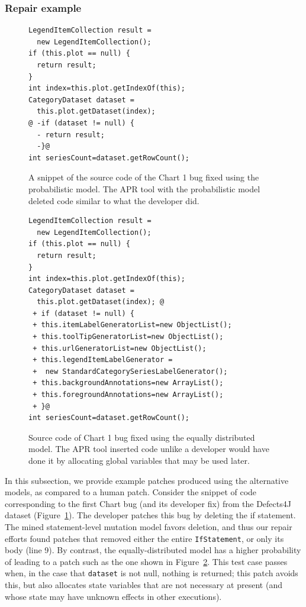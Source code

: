\documentclass[conference]{IEEEtran}
\begin{document}
\subsubsection{Repair example} \label{examPatches}

\begin{figure}[t]
\begin{lstlisting}[frame=single,style=base]
LegendItemCollection result = 
  new LegendItemCollection();
if (this.plot == null) {
  return result;
}
int index=this.plot.getIndexOf(this);
CategoryDataset dataset = 
  this.plot.getDataset(index);
@ -if (dataset != null) {
  - return result;
  -}@
int seriesCount=dataset.getRowCount();
	\end{lstlisting}
	\caption{A snippet of the source code of the Chart 1 bug fixed using the
      probabilistic model. The APR tool with the probabilistic model deleted code similar to what the
      developer did.\label{fig:chart1.1}}
\end{figure}

\begin{figure}[t]
\begin{lstlisting}[frame=single,style=base]
LegendItemCollection result = 
  new LegendItemCollection();
if (this.plot == null) {
  return result;
}
int index=this.plot.getIndexOf(this);
CategoryDataset dataset = 
  this.plot.getDataset(index); @
 + if (dataset != null) { 
 + this.itemLabelGeneratorList=new ObjectList();
 + this.toolTipGeneratorList=new ObjectList();
 + this.urlGeneratorList=new ObjectList();
 + this.legendItemLabelGenerator = 
 +  new StandardCategorySeriesLabelGenerator();
 + this.backgroundAnnotations=new ArrayList();
 + this.foregroundAnnotations=new ArrayList();
 + }@
int seriesCount=dataset.getRowCount();
	\end{lstlisting}
	\caption{Source code of Chart 1 bug fixed using the equally distributed
      model. The APR tool inserted code unlike a developer would have done it by
      allocating global variables that may be used later.\label{fig:chart1.3}}

\end{figure}


In this subsection, we provide example patches produced using the alternative
models, as compared to a human patch.  Consider the snippet of code corresponding
to the first Chart bug (and its developer fix) from the Defects4J dataset
(Figure~\ref{fig:chart1.1}).  The developer patches this bug by deleting the if
statement.  The mined statement-level mutation model favors deletion, and thus
our repair efforts found patches that removed either the entire \texttt{IfStatement}, or only its body (line 9).
By contrast, the equally-distributed model has a higher probability of leading
to a patch such as the one shown in Figure~\ref{fig:chart1.3}.  This test case
passes when, in the case that \texttt{dataset} is not null, nothing is returned;
this patch avoids this, but also allocates state variables that are not
necessary at present (and whose state may have unknown effects in other
executions). 
\end{document}
